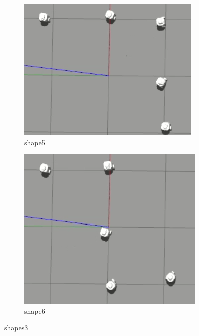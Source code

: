 \documentclass[12pt]{extarticle}
\begin{document}
\begin{figure}
\centering
\begin{subfigure}{.5\textwidth}
  \centering
  \includegraphics[width=.9\linewidth]{shape5}
  \caption{shape5}
  \label{fig:sub1}
\end{subfigure}%
\begin{subfigure}{.5\textwidth}
  \centering
  \includegraphics[width=.9\linewidth]{shape6}
  \caption{shape6}
  \label{fig:sub2}
\end{subfigure}
\caption{shapes3}
\label{fig:test}





\end{figure}
\end{document}
